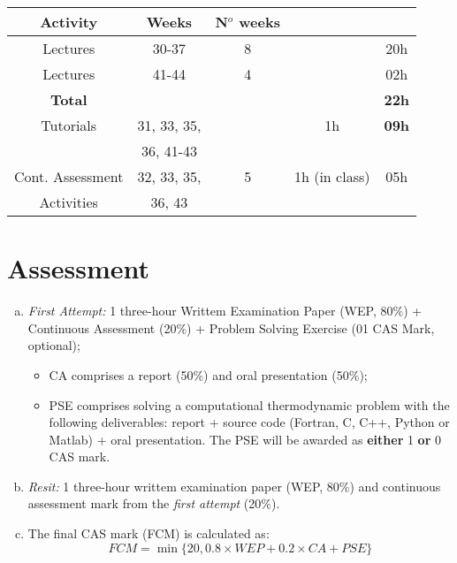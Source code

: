 \documentclass[11pt,oneside,a4paper]{article}
\begin{document}
\begin{center}
\begin{tabular}{||c c c c c ||}
\hline\hline
{\bf Activity} & {\bf Weeks}  & {\bf N$^{o}$ weeks} &                &       \\
\hline\hline
Lectures       &  30-37       &  8                 &   &  20h    \\
Lectures       &  41-44       &  4                 &   &  02h     \\
{\bf Total}    &              &                    &                &  {\bf 22h}\\
\hline
Tutorials      & 31, 33, 35,  &                   &  1h            &  {\bf 09h}  \\
               & 36, 41-43    &                   &                &            \\
\hline
Cont. Assessment     & 32, 33, 35,  &  5                &  1h (in class) &   05h  \\
Activities           & 36, 43       &                   &                &      \\ 
\hline\hline
\end{tabular}
\end{center}

\section{Assessment}
\begin{enumerate}[(a)]
\item {\it First Attempt:} 1 three-hour Writtem Examination Paper (WEP, 80$\%$) + Continuous Assessment (20$\%$) + Problem Solving Exercise (01 CAS Mark, optional);
\begin{itemize}
\item CA comprises a report (50$\%$) and oral presentation (50$\%$);
\item PSE comprises solving a computational thermodynamic problem with the following deliverables: report + source code (Fortran, C, C++, Python or Matlab) + oral presentation. The PSE will be awarded as {\bf either} 1 {\bf or} 0 CAS mark.
\end{itemize}
\item {\it Resit:} 1 three-hour writtem examination paper (WEP, 80$\%$) and continuous assessment mark from the {\it first attempt} (20$\%$). 
\item The final CAS mark (FCM) is calculated as:
\begin{displaymath}
FCM = \min\{20, 0.8 \times WEP + 0.2 \times CA + PSE\}
\end{displaymath}
\end{enumerate}
\end{document}
